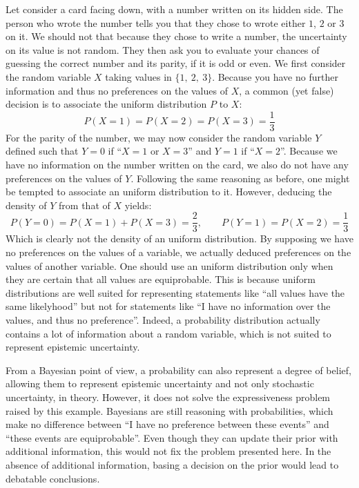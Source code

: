 \begin{example}\label{ex:proba_limitations}
    Let consider a card facing down, with a number written on its hidden side. The person who wrote the number tells you that they chose to wrote either $1$, $2$ or $3$ on it. We should not that because they chose to write a number, the uncertainty on its value is not random. They then ask you to evaluate your chances of guessing the correct number and its parity, \ie if it is odd or even. We first consider the random variable $X$ taking values in $\{1,~2,~3\}$. Because you have no further information and thus no preferences on the values of $X$, a common (yet false) decision is to associate the uniform distribution $P$ to $X$:
    \begin{equation*}
        P(X=1)=P(X=2)=P(X=3)=\frac{1}{3}
    \end{equation*}
    For the parity of the number, we may now consider the random variable $Y$ defined such that $Y=0$ if ``$X=1$ or $X=3$'' and $Y=1$ if ``$X=2$''. Because we have no information on the number written on the card, we also do not have any preferences on the values of $Y$. Following the same reasoning as before, one might be tempted to associate an uniform distribution to it. However, deducing the density of $Y$ from that of $X$ yields:
    \begin{equation*}
        P(Y=0)=P(X=1)+P(X=3)=\frac{2}{3},\qquad P(Y=1)=P(X=2) = \frac{1}{3}
    \end{equation*}
    Which is clearly not the density of an uniform distribution. By supposing we have no preferences on the values of a variable, we actually deduced preferences on the values of another variable. One should use an uniform distribution only when they are certain that all values are equiprobable. This is because uniform distributions are well suited for representing statements like ``all values have the same likelyhood'' but not for statements like ``I have no information over the values, and thus no preference''. Indeed, a probability distribution actually contains a lot of information about a random variable, which is not suited to represent epistemic uncertainty.
    
    \begin{remark}
        From a Bayesian point of view, a probability can also represent a degree of belief, allowing them to represent epistemic uncertainty and not only stochastic uncertainty, in theory. However, it does not solve the expressiveness problem raised by this example. Bayesians are still reasoning with probabilities, which make no difference between ``I have no preference between these events'' and ``these events are equiprobable''. Even though they can update their prior with additional information, this would not fix the problem presented here. In the absence of additional information, basing a decision on the prior would lead to debatable conclusions.
    \end{remark}
\end{example}

